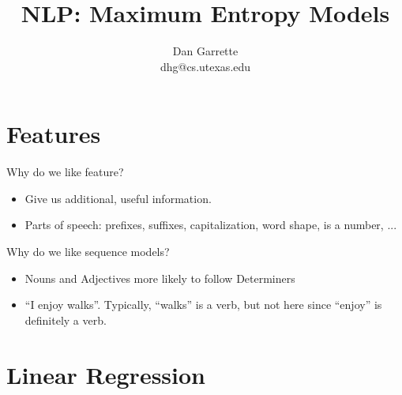 \documentclass[11pt,letterpaper]{article}
\title{NLP: Maximum Entropy Models}
\author{Dan Garrette\\\small{dhg@cs.utexas.edu}}
\begin{document}
\maketitle



\section{Features}

Why do we like feature?

\begin{itemize}
  \item Give us additional, useful information.
  \item Parts of speech: prefixes, suffixes, capitalization, word shape, is a number, ...
\end{itemize}

Why do we like sequence models?

\begin{itemize}
  \item Nouns and Adjectives more likely to follow Determiners
  \item ``I enjoy walks''.  Typically, ``walks'' is a verb, but not here since ``enjoy'' is definitely a verb.
\end{itemize}



\section{Linear Regression}
\end{document}
